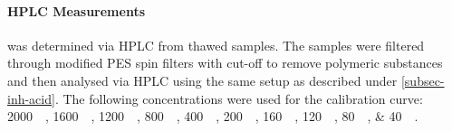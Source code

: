 \paragraph{HPLC Measurements\label{periodate-hplc}}
\Fora{} was determined via HPLC from thawed samples. The samples were filtered through modified PES spin filters with  cut-off to remove polymeric substances and then analysed via HPLC using the same setup as described under \vref{subsec-inh-acid}. The following concentrations were used for the \fora{} calibration curve: \SIlist{2000; 1600; 1200; 800; 400; 200; 160; 120; 80; 40}{\micro\M}.


